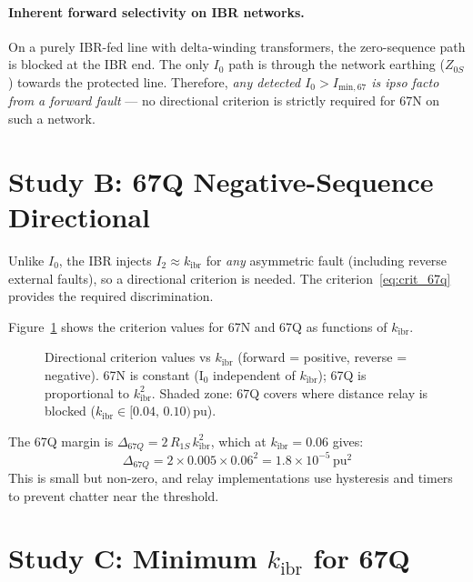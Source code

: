 \documentclass[11pt,a4paper]{article}
\begin{document}
\paragraph{Inherent forward selectivity on IBR networks.}
On a purely IBR-fed line with delta-winding transformers, the zero-sequence path
is blocked at the IBR end.  The only $I_0$ path is through the network earthing
($Z_{0S}$) towards the protected line.  Therefore, \emph{any detected $I_0 >
I_\mathrm{min,67}$ is ipso facto from a forward fault} --- no directional
criterion is strictly required for 67N on such a network.

\section{Study B: 67Q Negative-Sequence Directional}
\label{sec:67q}

Unlike $I_0$, the IBR injects $I_2 \approx k_\mathrm{ibr}$ for \emph{any} asymmetric
fault (including reverse external faults), so a directional criterion is needed.
The criterion~\eqref{eq:crit_67q} provides the required discrimination.

Figure~\ref{fig:margin} shows the criterion values for 67N and 67Q as functions
of $k_\mathrm{ibr}$.

\begin{figure}[h!]
\centering
\caption{%
  Directional criterion values vs $k_\mathrm{ibr}$ (forward = positive, reverse
  = negative).  67N is constant (I$_0$ independent of $k_\mathrm{ibr}$); 67Q
  is proportional to $k_\mathrm{ibr}^2$.  Shaded zone: 67Q covers where
  distance relay is blocked ($k_\mathrm{ibr} \in [0.04,\,0.10)$\,pu).}
\label{fig:margin}

\end{figure}

The 67Q margin is $\Delta_{67Q} = 2\,R_{1S}\,k_\mathrm{ibr}^2$, which at
$k_\mathrm{ibr}=0.06$ gives:
\begin{equation}
  \Delta_{67Q} = 2 \times 0.005 \times 0.06^2 = 1.8 \times 10^{-5}\,\mathrm{pu}^2
\end{equation}
This is small but non-zero, and relay implementations use hysteresis and timers
to prevent chatter near the threshold.

\section{Study C: Minimum $k_\mathrm{ibr}$ for 67Q}
\label{sec:sensitivity}
\end{document}
